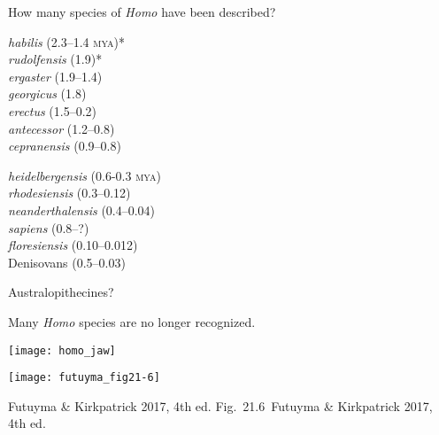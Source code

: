 \documentclass[t]{beamer}
\newcommand{\futuyma}[1]{%
	\ifthenelse{\isempty{#1}}%
	{Futuyma \& Kirkpatrick 2017, 4th ed.}%
	{Fig.~#1~Futuyma \& Kirkpatrick 2017, 4th ed.}%
}
\begin{document}
\begin{frame}{How many species of \textit{Homo} have been described?}

\begin{multicols}{2}
\textit{habilis} (2.3–1.4 \textsc{mya})*\\
\textit{rudolfensis} (1.9)*\\
\textit{ergaster} (1.9–1.4)\\
\textit{georgicus} (1.8)\\
\textit{erectus} (1.5–0.2)\\
\textit{antecessor} (1.2–0.8)\\
\textit{cepranensis} (0.9–0.8)\\

\columnbreak

\textit{heidelbergensis} (0.6-0.3 \textsc{mya})\\
\textit{rhodesiensis} (0.3–0.12)\\
\textit{neanderthalensis} (0.4–0.04)\\
\textit{sapiens} (0.8–?)\\
\textit{floresiensis} (0.10–0.012)\\
Denisovans (0.5–0.03)\\
\end{multicols}


\vfilll

\tiny * Australopithecines?

\end{frame}


\begin{frame}{Many \textit{Homo} species are no longer recognized.}

\texttt{[image: homo\_jaw]}


\end{frame}


\begin{frame}

\centering
\texttt{[image: futuyma\_fig21-6]}

\tinyfill \futuyma{21.6}

\end{frame}
\end{document}
